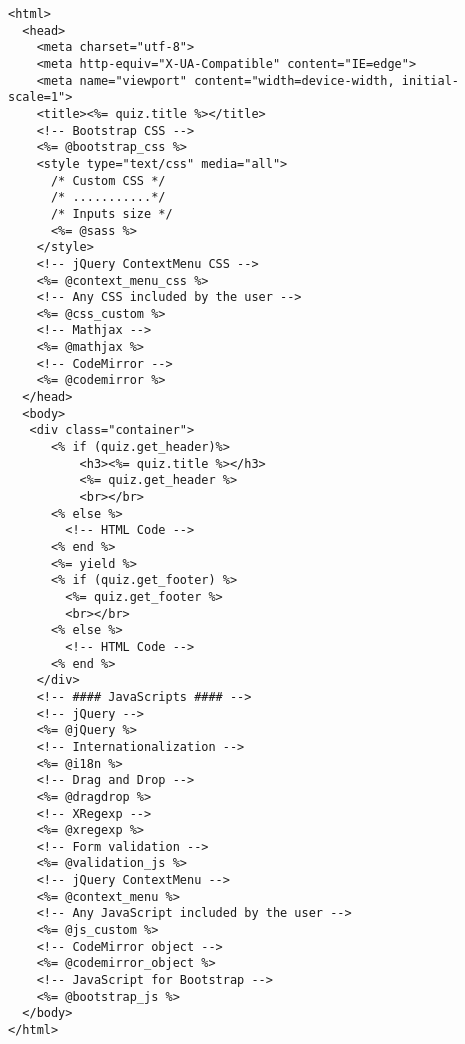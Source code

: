 \begin{verbatim}
<html>
  <head>
    <meta charset="utf-8">
    <meta http-equiv="X-UA-Compatible" content="IE=edge">
    <meta name="viewport" content="width=device-width, initial-scale=1">
    <title><%= quiz.title %></title>
    <!-- Bootstrap CSS -->
    <%= @bootstrap_css %>
    <style type="text/css" media="all">
      /* Custom CSS */
      /* ...........*/
      /* Inputs size */
      <%= @sass %>
    </style>
    <!-- jQuery ContextMenu CSS -->
    <%= @context_menu_css %>
    <!-- Any CSS included by the user -->
    <%= @css_custom %>
    <!-- Mathjax -->
    <%= @mathjax %>
    <!-- CodeMirror -->
    <%= @codemirror %>
  </head>
  <body>
   <div class="container">
      <% if (quiz.get_header)%>
          <h3><%= quiz.title %></h3>
          <%= quiz.get_header %>
          <br></br>
      <% else %>
        <!-- HTML Code -->
      <% end %>
      <%= yield %>
      <% if (quiz.get_footer) %>
        <%= quiz.get_footer %>
        <br></br>
      <% else %>
        <!-- HTML Code -->
      <% end %>
    </div>
    <!-- #### JavaScripts #### -->
    <!-- jQuery -->
    <%= @jQuery %>
    <!-- Internationalization -->
    <%= @i18n %>
    <!-- Drag and Drop -->
    <%= @dragdrop %>
    <!-- XRegexp -->
    <%= @xregexp %>
    <!-- Form validation -->
    <%= @validation_js %>
    <!-- jQuery ContextMenu -->
    <%= @context_menu %>
    <!-- Any JavaScript included by the user -->
    <%= @js_custom %>
    <!-- CodeMirror object -->
    <%= @codemirror_object %>
    <!-- JavaScript for Bootstrap -->
    <%= @bootstrap_js %>
  </body>
</html>
\end{verbatim}